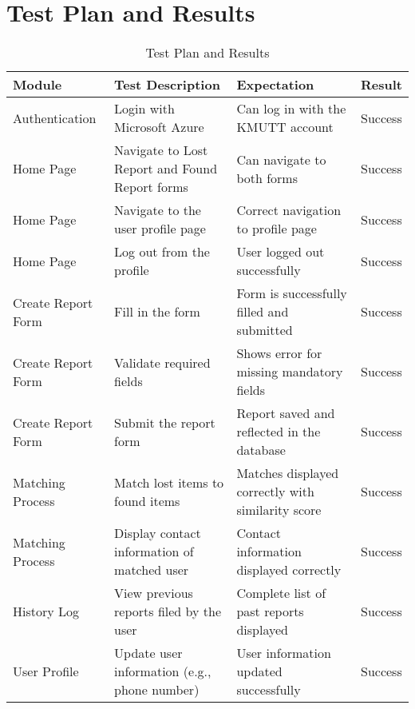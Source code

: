 \section{Test Plan and Results}
\begin{table}[h!]
\centering
\caption{Test Plan and Results}
\begin{tabular}{|l|p{6cm}|l|l|}
\hline
\textbf{Module} & \textbf{Test Description} & \textbf{Expectation} & \textbf{Result} \\
\hline
Authentication & Login with Microsoft Azure & Can log in with the KMUTT account & Success \\
\hline
Home Page & Navigate to Lost Report and Found Report forms & Can navigate to both forms & Success \\
\hline
Home Page & Navigate to the user profile page & Correct navigation to profile page & Success \\
\hline
Home Page & Log out from the profile & User logged out successfully & Success \\
\hline
Create Report Form & Fill in the form & Form is successfully filled and submitted & Success \\
\hline
Create Report Form & Validate required fields & Shows error for missing mandatory fields & Success \\
\hline
Create Report Form & Submit the report form & Report saved and reflected in the database & Success \\
\hline
Matching Process & Match lost items to found items & Matches displayed correctly with similarity score & Success \\
\hline
Matching Process & Display contact information of matched user & Contact information displayed correctly & Success \\
\hline
History Log & View previous reports filed by the user & Complete list of past reports displayed & Success \\
\hline
User Profile & Update user information (e.g., phone number) & User information updated successfully & Success \\
\hline
\end{tabular}
\end{table}

